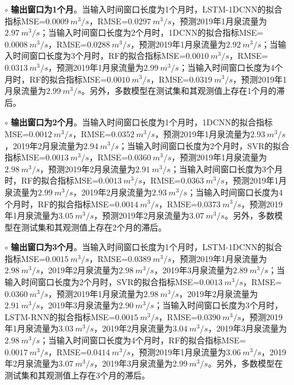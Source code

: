 \begin{enumerate}
  \begin{itemize}
    \item[$\circ$] \textbf{输出窗口为1个月}。当输入时间窗口长度为1个月时，LSTM-1DCNN的拟合指标MSE=$\SI{0.0009}{m^{3}/s}$，RMSE=$\SI{0.0297}{m^{3}/s}$，预测2019年1月泉流量为$\SI{2.97}{m^{3}/s}$；当输入时间窗口长度为2个月时，1DCNN的拟合指标MSE=$\SI{0.0008}{m^{3}/s}$，RMSE=$\SI{0.0288}{m^{3}/s}$，预测2019年1月泉流量为$\SI{2.92}{m^{3}/s}$；当输入时间窗口长度为3个月时，RF的拟合指标MSE=$\SI{0.0010}{m^{3}/s}$，RMSE=$\SI{0.0313}{m^{3}/s}$，预测2019年1月泉流量为$\SI{2.99}{m^{3}/s}$；当输入时间窗口长度为4个月时，RF的拟合指标MSE=$\SI{0.0010}{m^{3}/s}$，RMSE=$\SI{0.0319}{m^{3}/s}$，预测2019年1月泉流量为$\SI{2.99}{m^{3}/s}$。另外，多数模型在测试集和其观测值上存在1个月的滞后。
    \item[$\circ$] \textbf{输出窗口为2个月}。当输入时间窗口长度为1个月时，1DCNN的拟合指标MSE=$\SI{0.0012}{m^{3}/s}$，RMSE=$\SI{0.0352}{m^{3}/s}$，预测2019年1月泉流量为$\SI{2.93}{m^{3}/s}$，2019年2月泉流量为$\SI{2.94}{m^{3}/s}$；当输入时间窗口长度为2个月时，SVR的拟合指标MSE=$\SI{0.0013}{m^{3}/s}$，RMSE=$\SI{0.0360}{m^{3}/s}$，预测2019年1月泉流量为$\SI{2.98}{m^{3}/s}$，预测2019年2月泉流量为$\SI{2.91}{m^{3}/s}$；当输入时间窗口长度为3个月时，RF的拟合指标MSE=$\SI{0.0013}{m^{3}/s}$，RMSE=$\SI{0.0363}{m^{3}/s}$，预测2019年1月泉流量为$\SI{2.99}{m^{3}/s}$，2019年2月泉流量为$\SI{2.93}{m^{3}/s}$；当输入时间窗口长度为4个月时，RF的拟合指标MSE=$\SI{0.0014}{m^{3}/s}$，RMSE=$\SI{0.0373}{m^{3}/s}$，预测2019年1月泉流量为$\SI{3.05}{m^{3}/s}$，预测2019年2月泉流量为$\SI{3.07}{m^{3}/s}$。另外，多数模型在测试集和其观测值上存在2个月的滞后。
    \item[$\circ$] \textbf{输出窗口为3个月}。当输入时间窗口长度为1个月时，LSTM-1DCNN的拟合指标MSE=$\SI{0.0015}{m^{3}/s}$，RMSE=$\SI{0.0389}{m^{3}/s}$，预测2019年1月泉流量为$\SI{2.98}{m^{3}/s}$，2019年2月泉流量为$\SI{2.98}{m^{3}/s}$，2019年3月泉流量为$\SI{2.89}{m^{3}/s}$；当输入时间窗口长度为2个月时，SVR的拟合指标MSE=$\SI{0.0013}{m^{3}/s}$，RMSE=$\SI{0.0360}{m^{3}/s}$，预测2019年1月泉流量为$\SI{2.98}{m^{3}/s}$，2019年2月泉流量为$\SI{2.91}{m^{3}/s}$，2019年3月泉流量为$\SI{2.90}{m^{3}/s}$；当输入时间窗口长度为3个月时，LSTM-RNN的拟合指标MSE=$\SI{0.0015}{m^{3}/s}$，RMSE=$\SI{0.0390}{m^{3}/s}$，预测2019年1月泉流量为$\SI{3.03}{m^{3}/s}$，2019年2月泉流量为$\SI{3.04}{m^{3}/s}$，2019年3月泉流量为$\SI{2.98}{m^{3}/s}$；当输入时间窗口长度为4个月时，RF的拟合指标MSE=$\SI{0.0017}{m^{3}/s}$，RMSE=$\SI{0.0414}{m^{3}/s}$，预测2019年1月泉流量为$\SI{3.06}{m^{3}/s}$，2019年2月泉流量为$\SI{3.07}{m^{3}/s}$，2019年3月泉流量为$\SI{2.99}{m^{3}/s}$。另外，多数模型在测试集和其观测值上存在3个月的滞后。

\end{itemize}
\end{enumerate}
